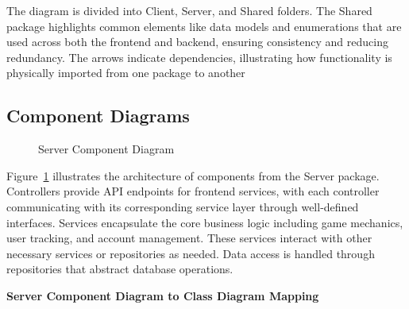 \documentclass[11pt,a4paper]{article}
\newcommand{\inputdiagram}[1]{}
\newcommand{\textwidthdiagram}[2][1]{%
  \resizebox{#1\textwidth}{!}{\inputdiagram{#2}}%
}
\begin{document}
The diagram is divided into Client, Server, and Shared folders. The Shared package highlights common elements like data models and enumerations that are used across both the frontend and backend, ensuring consistency and reducing redundancy. The arrows indicate dependencies, illustrating how functionality is physically imported from one package to another



\subsection{Component Diagrams}

\begin{figure}[H]
    \centering
    \textwidthdiagram{server_component_diagram.latex}
    \caption{Server Component Diagram}
    \label{fig:server_component_diagram}
\end{figure}

Figure~\ref{fig:server_component_diagram} illustrates the architecture of components from the Server package. Controllers provide API endpoints for frontend services, with each controller communicating with its corresponding service layer through well-defined interfaces. Services encapsulate the core business logic including game mechanics, user tracking, and account management. These services interact with other necessary services or repositories as needed. Data access is handled through repositories that abstract database operations.


\textbf{Server Component Diagram to Class Diagram Mapping}
\end{document}
